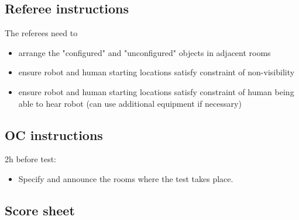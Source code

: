 \subsection{Referee instructions}

The referees need to
\begin{itemize}
	\item arrange the "configured" and "unconfigured" objects in adjacent rooms
	\item ensure robot and human starting locations satisfy constraint of non-visibility
	\item ensure robot and human starting locations satisfy constraint of human being able to hear robot (can use additional equipment if necessary)
\end{itemize}

\subsection{OC instructions}

2h before test:
\begin{itemize}
	\item Specify and announce the rooms where the test takes place.
\end{itemize}

\newpage
\subsection{Score sheet}
